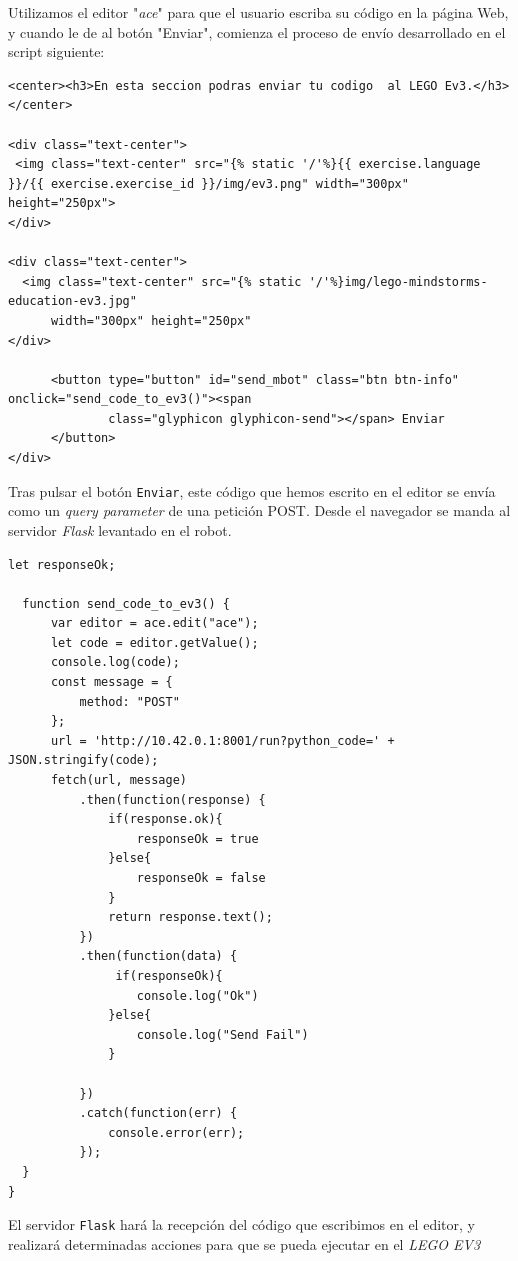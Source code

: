 Utilizamos el editor "\textit{ace}" para que el usuario escriba su código en la página Web, y cuando le de al botón "Enviar", comienza el proceso de envío desarrollado en el script siguiente:
\\
\begin{lstlisting}[frame=single,breaklines=true, label=Función de envío del código al servidor, caption=Función de envío del código al servidor captionpos=b] <center><h3>En esta seccion podras enviar tu codigo  al LEGO Ev3.</h3></center>

<div class="text-center">
 <img class="text-center" src="{% static '/'%}{{ exercise.language }}/{{ exercise.exercise_id }}/img/ev3.png" width="300px" height="250px">
</div>

<div class="text-center">
  <img class="text-center" src="{% static '/'%}img/lego-mindstorms-education-ev3.jpg"
      width="300px" height="250px"
</div>

      <button type="button" id="send_mbot" class="btn btn-info" onclick="send_code_to_ev3()"><span
              class="glyphicon glyphicon-send"></span> Enviar
      </button>
</div>
\end{lstlisting}
Tras pulsar el botón \texttt{Enviar}, este código que hemos escrito en el editor se envía como un \textit{query parameter} de una petición POST. Desde el navegador se manda al servidor \textit{Flask} levantado en el robot. 
\\
\begin{lstlisting}[frame=single,breaklines=true, label=Función de envío del código al servidor, caption=Función de envío del código al servidor,  captionpos=b]
let responseOk;

  function send_code_to_ev3() {
      var editor = ace.edit("ace");
      let code = editor.getValue();
      console.log(code);
      const message = {
          method: "POST"
      };
      url = 'http://10.42.0.1:8001/run?python_code=' + JSON.stringify(code);
      fetch(url, message)
          .then(function(response) {
              if(response.ok){
                  responseOk = true
              }else{
                  responseOk = false
              }
              return response.text();
          })
          .then(function(data) {
               if(responseOk){
                  console.log("Ok")
              }else{
                  console.log("Send Fail")
              }

          })
          .catch(function(err) {
              console.error(err);
          });
  }
}
\end{lstlisting}
El servidor \texttt{Flask} hará la recepción del código que escribimos en el editor, y realizará determinadas acciones para que se pueda ejecutar en el \textit{LEGO EV3}


